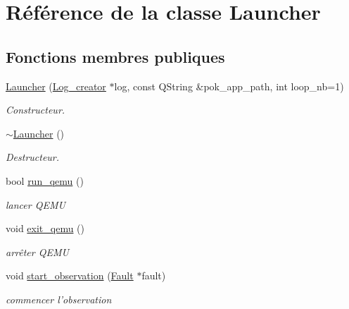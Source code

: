 \hypertarget{classLauncher}{
\section{Référence de la classe Launcher}
\label{classLauncher}
}
\subsection*{Fonctions membres publiques}
\begin{DoxyCompactItemize}
\item 
\hyperlink{classLauncher_ae4326673c70640ebc88ea697f624d567}{Launcher} (\hyperlink{classLog__creator}{Log\_\-creator} $\ast$log, const QString \&pok\_\-app\_\-path, int loop\_\-nb=1)
\begin{DoxyCompactList}\small\item\em Constructeur. \item\end{DoxyCompactList}\item 
\hypertarget{classLauncher_a7fb35def86a53bb0dce1267fe2adf019}{
\hyperlink{classLauncher_a7fb35def86a53bb0dce1267fe2adf019}{$\sim$Launcher} ()}
\label{classLauncher_a7fb35def86a53bb0dce1267fe2adf019}

\begin{DoxyCompactList}\small\item\em Destructeur. \item\end{DoxyCompactList}\item 
bool \hyperlink{classLauncher_aa32824612c6a58b3e38235f759b8c9ea}{run\_\-qemu} ()
\begin{DoxyCompactList}\small\item\em lancer QEMU \item\end{DoxyCompactList}\item 
\hypertarget{classLauncher_aef18c1ef86b51595e9b71dbc45fd796e}{
void \hyperlink{classLauncher_aef18c1ef86b51595e9b71dbc45fd796e}{exit\_\-qemu} ()}
\label{classLauncher_aef18c1ef86b51595e9b71dbc45fd796e}

\begin{DoxyCompactList}\small\item\em arrêter QEMU \item\end{DoxyCompactList}\item 
void \hyperlink{classLauncher_a0d057d62987a21971eaa9e49856e2327}{start\_\-observation} (\hyperlink{classFault}{Fault} $\ast$fault)
\begin{DoxyCompactList}\small\item\em commencer l'observation \item\end{DoxyCompactList}\end{DoxyCompactItemize}


